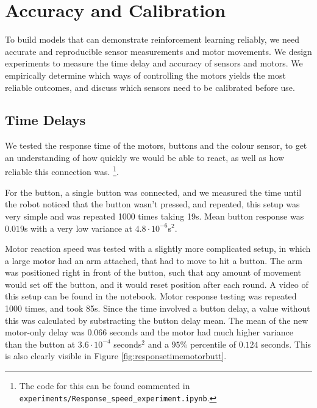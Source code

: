 \documentclass[11pt, a4paper]{article}
\begin{document}
	\section{Accuracy and Calibration}
	To build models that can demonstrate reinforcement learning reliably, we need accurate and reproducible sensor measurements and motor movements. We design experiments to measure the time delay and accuracy of sensors and motors. We empirically determine which ways of controlling the motors yields the most reliable outcomes, and discuss which sensors need to be calibrated before use. 
	
	\subsection{Time Delays}
	
	We tested the response time of the motors, buttons and the colour sensor, to get an understanding of how quickly we would be able to react, as well as how reliable this connection was. \footnote{The code for this can be found commented in \texttt{experiments/Response\_speed\_experiment.ipynb}.}. 
	
	For the button, a single button was connected, and we measured the time until the robot noticed that the button wasn't pressed, and repeated, this setup was very simple and was repeated 1000 times taking 19s. Mean button response was $0.019$s with a very low variance at $4.8\cdot 10^{-6}$s$^2$.
	
	Motor reaction speed was tested with a slightly more complicated setup, in which a large motor had an arm attached, that had to move to hit a button. The arm was positioned right in front of the button, such that any amount of movement would set off the button, and it would reset position after each round. A video of this setup can be found in the notebook. Motor response testing was repeated 1000 times, and took 85s. Since the time involved a button delay, a value without this was calculated by substracting the button delay mean. The mean of the new motor-only delay was $0.066$ seconds and the motor had much higher variance than the button at $3.6\cdot 10^{-4}$ seconds$^2$ and a $95\%$ percentile of $0.124$ seconds. This is also clearly visible in Figure \ref{fig:responsetimemotorbutt}.
	
\end{document}
